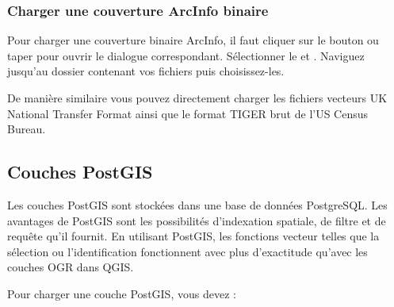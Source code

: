 \subsubsection{Charger une couverture ArcInfo binaire}
Pour charger une couverture binaire ArcInfo, il faut cliquer sur le bouton  ou taper  pour ouvrir le dialogue correspondant. Sélectionner le  et . Naviguez jusqu'au dossier contenant vos fichiers puis choisissez-les.

De manière similaire vous pouvez directement charger les fichiers vecteurs UK National Transfer Format ainsi que le format TIGER brut de l'US Census Bureau.

\subsection{Couches PostGIS}
\label{label_postgis}

Les couches PostGIS sont stockées dans une base de données PostgreSQL. Les avantages de PostGIS sont les possibilités d'indexation spatiale, de filtre et de requête qu'il fournit. En utilisant PostGIS, les fonctions vecteur telles que la sélection ou l'identification fonctionnent avec plus d'exactitude qu'avec les couches OGR dans QGIS.

Pour charger une couche PostGIS, vous devez :

